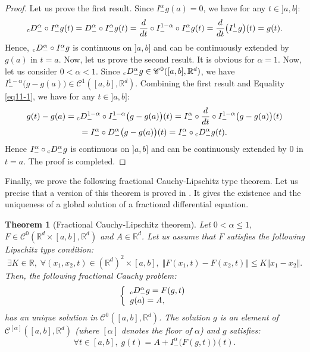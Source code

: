 \documentclass[english,11pt,reqno]{smfart}
\newtheorem{theorem}{Theorem}
\newcommand{\R}{\mathbb{R}}
\newcommand{\CC}{\mathscr{C}}
\newcommand{\cDM}{{}_{{\rm c}} D^\alpha_-}
\newcommand{\DM}{D^\alpha_-}
\begin{document}
\begin{proof}
Let us prove the first result. Since $I^\alpha_- g (a) =0$, we have for any $t \in ]a,b]$:
\begin{equation}
\cDM \circ I^\alpha_- g(t) = \DM \circ I^\alpha_- g(t) = \dfrac{d}{dt} \circ I^{1-\alpha}_- \circ I^\alpha_- g (t) = \dfrac{d}{dt} \big( I^1_- g \big) (t) = g(t).
\end{equation}
Hence, $\cDM \circ I^\alpha_- g $ is continuous on $]a,b]$ and can be continuously extended by $g(a)$ in $t=a$. Now, let us prove the second result. It is obvious for $\alpha =1$. Now, let us consider $0 < \alpha < 1$. Since $\cDM g \in \CC^0 ([a,b],\R^d)$, we have $I^{1-\alpha}_- \big( g - g(a) \big) \in \CC^1 ([a,b],\R^d)$. Combining the first result and Equality \eqref{eq11-1}, we have for any $t \in ]a,b]$:
\begin{multline}
g(t)-g(a) = {}_{\text{c}} D^{1-\alpha}_- \circ I^{1-\alpha}_- \big( g - g(a) \big) (t) = I^\alpha_- \circ \dfrac{d}{dt} \circ I^{1-\alpha}_- \big( g - g(a) \big) (t) \\ = I^\alpha_- \circ \DM \big( g - g(a) \big) (t) = I^\alpha_- \circ \cDM g (t).
\end{multline}
Hence $ I^\alpha_- \circ \cDM g $ is continuous on $]a,b]$ and can be continuously extended by $0$ in $t=a$. The proof is completed.
\end{proof}

Finally, we prove the following fractional Cauchy-Lipschitz type theorem. Let us precise that a version of this theorem is proved in \cite[Part 3.5.1, Corollary 3.26, p.205]{kilb}. It gives the existence and the uniqueness of a global solution of a fractional differential equation.
\begin{theorem}[Fractional Cauchy-Lipschitz theorem]\label{thmfcl}
Let $0 < \alpha \leq 1$, $F \in \CC^0(\R^d \times [a,b], \R^d)$ and $A \in \R^d$. Let us assume that $F$ satisfies the following Lipschitz type condition:
\begin{equation}
\exists K \in \R, \; \forall (x_1,x_2,t) \in (\R^d)^2 \times [a,b], \; \Vert F(x_1,t)-F(x_2,t) \Vert \leq K \Vert x_1 - x_2 \Vert .
\end{equation}
Then, the following fractional Cauchy problem:
\begin{equation}\label{eqcp}
 \left\lbrace \begin{array}{l}
 		\cDM g = F(g,t) \\
 		g(a) = A,
        \end{array}
\right.
\end{equation}
has an unique solution in $\CC^0 ([a,b],\R^d)$. The solution $g$ is an element of $ \CC^{[\alpha]} ([a,b],\R^d)$ (where $[\alpha]$ denotes the floor of $\alpha$) and $g$ satisfies:
\begin{equation}\label{eqcp2}
\forall t \in [a,b], \; g(t) = A + I^\alpha_- \big( F(g,t) \big) (t).
\end{equation}
\end{theorem}
\end{document}
